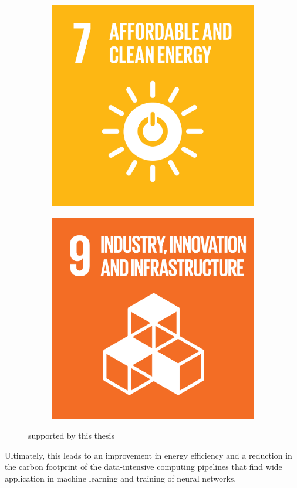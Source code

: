 \begin{figure}[b]
    \centering
    \begin{subfigure}[b]{0.5\linewidth}
        \centering
        \includegraphics[width=0.6\linewidth]{figures/1-introduction/E_SDG_goals_icons-07.png} 
        \label{fig:sdg07}
    \end{subfigure}\hfill
    \begin{subfigure}[b]{0.5\linewidth}
        \centering
        \includegraphics[width=0.6\linewidth]{figures/1-introduction/E_SDG-goals_icons-09.png}
        \label{fig:sdg09}
	\end{subfigure}
	\caption{ supported by this thesis}
	\label{fig:sdgs}
\end{figure}

Ultimately, this leads to an improvement in energy efficiency and a reduction in the carbon footprint of the data-intensive computing pipelines that find wide application in machine learning and training of neural networks.
